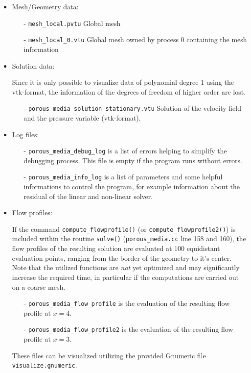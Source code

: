 \documentclass{article}
\begin{document}
\begin{itemize}
 \item Mesh/Geometry data:
\begin{itemize}
      \item[-] \texttt{mesh\_local.pvtu} Global mesh
      \item[-] \texttt{mesh\_local\_0.vtu} Global mesh owned by process 0 containing the mesh information
\end{itemize}
\item[]
\item Solution data:

\item[]Since it is only possible to visualize data of polynomial degree 1 using the vtk-format, the information of the degrees of freedom of higher order are lost.
\begin{itemize}
      \item[-] \texttt{porous\_media\_solution\_stationary.vtu} Solution of the velocity field and the pressure variable (vtk-format).
\end{itemize}

\item Log files:
\begin{itemize}
      \item[-] \texttt{porous\_media\_debug\_log} is a list of errors helping to simplify the debugging process.
This file is empty if the program runs without errors.
      \item[-] \texttt{porous\_media\_info\_log} is a list of parameters and some helpful informations to control
the program, for example information about the residual of the linear and non-linear solver.
\end{itemize}
\item[]
\item Flow profiles:

\item[] If the command \texttt{compute\_flowprofile()} (or \texttt{compute\_flowprofile2()}) is included within the routine \texttt{solve()} (\texttt{porous\_media.cc} line 158 and 160), the flow profiles of the resulting solution are evaluated at 100 equidistant evaluation points, ranging from the border of the geometry to it's center. Note that the utilized functions are \emph{not} yet optimized and may significantly increase the required time, in particular if the computations are carried out on a coarse mesh. 
\begin{itemize}
      \item[-] \texttt{porous\_media\_flow\_profile} is the evaluation of the resulting flow profile at $x=4$.
      \item[-] \texttt{porous\_media\_flow\_profile2} is the evaluation of the resulting flow profile at $x=3$.
\end{itemize}
\item[] These files can be visualized utilizing the provided Gnumeric \cite{Gnumeric} file \texttt{visualize.gnumeric}.
\end{itemize}
\end{document}
